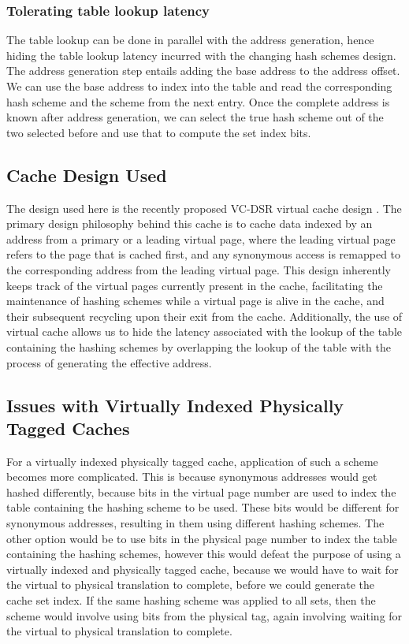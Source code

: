 \subsubsection{Tolerating table lookup latency}
The table lookup can be done in parallel with the address generation, hence hiding the table lookup latency incurred with the changing hash schemes design. The address generation step entails adding the base address to the address offset. We can use the base address to index into the table and read the corresponding hash scheme and the scheme from the next entry. Once the complete address is known after address generation, we can select the true hash scheme out of the two selected before and use that to compute the set index bits. 

\subsection{Cache Design Used}
The design used here is the recently proposed VC-DSR virtual cache design \cite{}. The primary design philosophy behind this cache is to cache data indexed by an address from a primary or a leading virtual page, where the leading virtual page refers to the page that is cached first, and any synonymous access is remapped to the corresponding address from the leading virtual page.  This design inherently keeps track of the virtual pages currently present in the cache, facilitating the maintenance of hashing schemes while a virtual page is alive in the cache, and their subsequent recycling upon their exit from the cache. Additionally, the use of virtual cache allows us to hide the latency associated with the lookup of the table containing the hashing schemes by overlapping the lookup of the table with the process of generating the effective address. 

\subsection{Issues with Virtually Indexed Physically Tagged Caches}
For a virtually indexed physically tagged cache, application of such a scheme becomes more complicated. This is because synonymous addresses would get hashed differently, because bits in the virtual page number are used to index the table containing the hashing scheme to be used. These bits would be different for synonymous addresses, resulting in them using different hashing schemes. The other option would be to use bits in the physical page number to index the table containing the hashing schemes, however this would defeat the purpose of using a virtually indexed and physically tagged cache, because we would have to wait for the virtual to physical translation to complete, before we could generate the cache set index. If the same hashing scheme was applied to all sets, then the scheme would involve using bits from the physical tag, again involving waiting for the virtual to physical translation to complete. 

